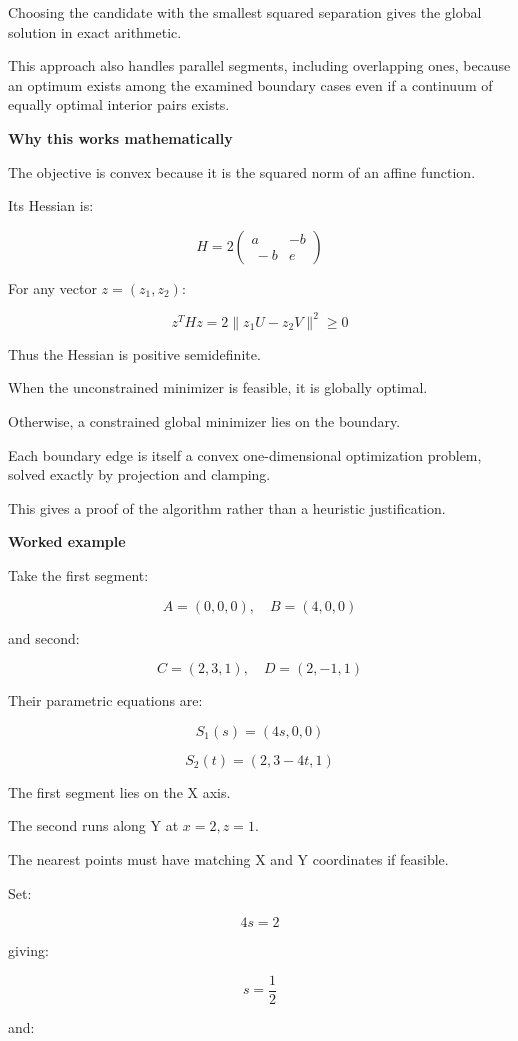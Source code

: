 Choosing the candidate with the smallest squared separation gives the global solution in exact arithmetic.

This approach also handles parallel segments, including overlapping ones, because an optimum exists among the examined boundary cases even if a continuum of equally optimal interior pairs exists.

\textbf{Why this works mathematically}

The objective is convex because it is the squared norm of an affine function.

Its Hessian is:

\[
H= 2\begin{pmatrix} a&-b\\\ -b&e \end{pmatrix}
\]

For any vector \(z=(z_1,z_2)\):

\[
z^THz = 2\|z_1U-z_2V\|^2\ge0
\]

Thus the Hessian is positive semidefinite.

When the unconstrained minimizer is feasible, it is globally optimal.

Otherwise, a constrained global minimizer lies on the boundary.

Each boundary edge is itself a convex one-dimensional optimization problem, solved exactly by projection and clamping.

This gives a proof of the algorithm rather than a heuristic justification.

\textbf{Worked example}

Take the first segment:

\[
A=(0,0,0),\quad B=(4,0,0)
\]

and second:

\[
C=(2,3,1),\quad D=(2,-1,1)
\]

Their parametric equations are:

\[
S_1(s)=(4s,0,0)
\]

\[
S_2(t)=(2,3-4t,1)
\]

The first segment lies on the X axis.

The second runs along Y at \(x=2,z=1\).

The nearest points must have matching X and Y coordinates if feasible.

Set:

\[
4s=2
\]

giving:

\[
s=\frac12
\]

and:

